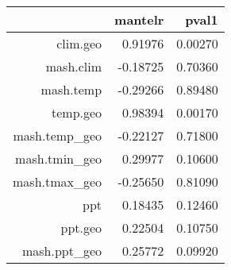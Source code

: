 \begin{table}[ht]
\centering
\begin{tabular}{rrr}
  \hline
 & mantelr & pval1 \\ 
  \hline
clim.geo & 0.91976 & 0.00270 \\ 
  mash.clim & -0.18725 & 0.70360 \\ 
  mash.temp & -0.29266 & 0.89480 \\ 
  temp.geo & 0.98394 & 0.00170 \\ 
  mash.temp\_geo & -0.22127 & 0.71800 \\ 
  mash.tmin\_geo & 0.29977 & 0.10600 \\ 
  mash.tmax\_geo & -0.25650 & 0.81090 \\ 
  ppt & 0.18435 & 0.12460 \\ 
  ppt.geo & 0.22504 & 0.10750 \\ 
  mash.ppt\_geo & 0.25772 & 0.09920 \\ 
   \hline
\end{tabular}
\end{table}
